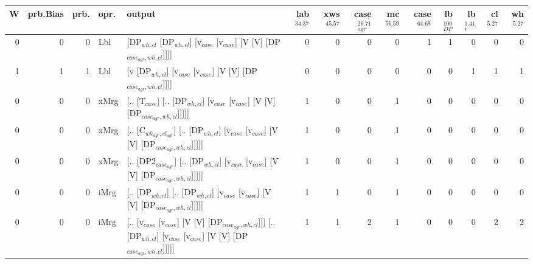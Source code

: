 \begin{tabularx}{\linewidth}{rrrlXrrrrrrrrr}
\hline
   W &   prb.Bias &   prb. & opr.   & output                                                                                                           &   lab$^{34.37}$ &   xws$^{45.57}$ &   case$_{agr}^{26.71}$ &   mc$^{56.59}$ &   case$^{64.68}$ &   lb$_{DP}^{100}$ &   lb$_{v}^{1.41}$ &   cl$^{5.27}$ &   wh$^{5.27}$ \\
\hline
   0 &       0 &   0 & Lbl  & [DP$_{wh,cl}$ [DP$_{wh,cl}$] [v$_{case}$ [v$_{case}$] [V [V] [DP$_{case_{agr},wh,cl}$]]]]                                              &             0 &             0 &                  0 &            0 &              1 &                1 &             0 &        0 &        0 \\
   1 &       1 &   1 & Lbl  & [v [DP$_{wh,cl}$] [v$_{case}$ [v$_{case}$] [V [V] [DP$_{case_{agr},wh,cl}$]]]]                                                     &             0 &             0 &                  0 &            0 &              0 &                0 &             1 &        1 &        1 \\
   0 &       0 &   0 & xMrg & [.. [T$_{case}$] [.. [DP$_{wh,cl}$] [v$_{case}$ [v$_{case}$] [V [V] [DP$_{case_{agr},wh,cl}$]]]]]                                      &             1 &             0 &                  0 &            1 &              0 &                0 &             0 &        0 &        0 \\
   0 &       0 &   0 & xMrg & [.. [C$_{wh_{agr},cl_{agr}}$] [.. [DP$_{wh,cl}$] [v$_{case}$ [v$_{case}$] [V [V] [DP$_{case_{agr},wh,cl}$]]]]]                             &             1 &             0 &                  0 &            1 &              0 &                0 &             0 &        0 &        0 \\
   0 &       0 &   0 & xMrg & [.. [DP2$_{case_{agr}}$] [.. [DP$_{wh,cl}$] [v$_{case}$ [v$_{case}$] [V [V] [DP$_{case_{agr},wh,cl}$]]]]]                                &             1 &             0 &                  0 &            1 &              0 &                0 &             0 &        0 &        0 \\
   0 &       0 &   0 & iMrg & [.. [DP$_{wh,cl}$] [.. [DP$_{wh,cl}$] [v$_{case}$ [v$_{case}$] [V [V] [DP$_{case_{agr},wh,cl}$]]]]]                                    &             1 &             1 &                  0 &            1 &              0 &                0 &             0 &        0 &        0 \\
   0 &       0 &   0 & iMrg & [.. [v$_{case}$ [v$_{case}$] [V [V] [DP$_{case_{agr},wh,cl}$]]] [.. [DP$_{wh,cl}$] [v$_{case}$ [v$_{case}$] [V [V] [DP$_{case_{agr},wh,cl}$]]]]] &             1 &             1 &                  2 &            1 &              0 &                0 &             0 &        2 &        2 \\

\end{tabularx}
